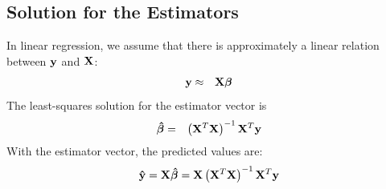 \documentclass[11pt]{article}
\theoremstyle{remark}
\begin{document}
\subsection{Solution for the Estimators}
In linear regression, we assume that there is approximately a linear relation between $\bold{y}$ and $\bold{X}$:
\begin{eqnarray}
\bold{y} &\approx& \bold{X}\boldsymbol{\beta}
\end{eqnarray}
The least-squares solution for the estimator vector is
\begin{eqnarray}
\boldsymbol{\hat{\beta}} &=& \left(\bold{X}^T\bold{X}\right)^{-1}\bold{X}^T\bold{y}
\label{EstimatorSolution}
\end{eqnarray}
With the estimator vector, the predicted values are:
\begin{equation}
\bold{\hat{y}} = \bold{X}\boldsymbol{\hat{\beta}} = \bold{X}\left(\bold{X}^T\bold{X}\right)^{-1}\bold{X}^T\bold{y}
\end{equation}
\end{document}
